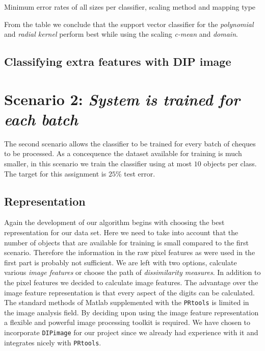 \documentclass{article}
\begin{document}
\begin{table}[H]
  \caption{Minimum error rates of all sizes per classifier, scaling method and mapping type} \label{table: error rate summary PCA2}   
\end{table}%

From the table we conclude that the support vector classifier for the \textit{polynomial} and \textit{radial kernel} perform best while using the scaling \textit{c-mean} and \textit{domain}. 



\subsection{Classifying extra features with DIP image}

\clearpage



\section{Scenario 2: \textit{System is trained for each batch}}

The second scenario allows the classifier to be trained for every batch of cheques to be processed. As a concequence the dataset available for training is much smaller, in this scenario we train the classifier using at most $10$ objects per class. The target for this assignment is $25\%$ test error.

\subsection{Representation}
Again the development of our algorithm begins with choosing the best representation for our data set. Here we need to take into account that the number of objects that are available for training is small compared to the first scenario. Therefore the information in the raw pixel features as were used in the first part is probably not sufficient. We are left with two options, calculate various \emph{image features} or choose the path of \emph{dissimilarity measures}. In addition to the pixel features we decided to calculate image features. The advantage over the image feature representation is that every aspect of the digits can be calculated. \\

The standard methods of Matlab supplemented with the \texttt{PRtools} is limited in the image analysis field. By deciding upon using the image feature representation a flexible and powerful image processing toolkit is required. We have chosen to incorporate \texttt{DIPimage} for our project since we already had experience with it and integrates nicely with \texttt{PRtools}.
\end{document}
